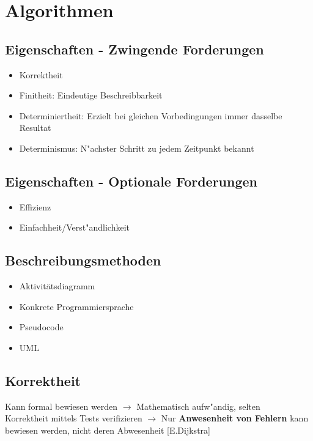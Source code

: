 \section{Algorithmen}
\subsection{Eigenschaften - Zwingende Forderungen}
\begin{itemize}
	\item Korrektheit
	\item Finitheit: Eindeutige Beschreibbarkeit
	\item Determiniertheit: Erzielt bei gleichen Vorbedingungen immer dasselbe Resultat
	\item Determinismus: N"achster Schritt zu jedem Zeitpunkt bekannt
\end{itemize}

\subsection{Eigenschaften - Optionale Forderungen}
\begin{itemize}
	\item Effizienz 
	\item Einfachheit/Verst"andlichkeit
\end{itemize}

\subsection{Beschreibungsmethoden}
\begin{itemize}
	\item Aktivitätsdiagramm
	\item Konkrete Programmiersprache
	\item Pseudocode
	\item UML
\end{itemize}

\subsection{Korrektheit}
Kann formal bewiesen werden $\rightarrow$ Mathematisch aufw"andig, selten\\
Korrektheit mittels Tests verifizieren $\rightarrow$ Nur \textbf{Anwesenheit von Fehlern} kann bewiesen werden, nicht deren Abwesenheit [E.Dijkstra]

